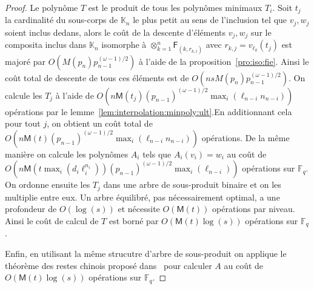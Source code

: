 \documentclass[10pt,a4paper]{book}
\theoremstyle{plain}
\theoremstyle{definition}
\theoremstyle{definition}
\theoremstyle{definition}
\theoremstyle{definition}
\theoremstyle{remark}
\theoremstyle{remark}
\theoremstyle{definition}
\begin{document}
\begin{proof}
  Le polynôme $T$ est le produit de tous les polynômes minimaux $T_i$. 
  Soit $t_j$ la cardinalité du sous-corps de $\mathbb{K}_n$ le plus petit au 
  sens  de l'inclusion tel que $v_j,w_j$ soient inclus dedans, alors le coût de
  la descente d'éléments $v_j,w_j$ sur le composita inclus dans $\mathbb{K}_n$ 
  isomorphe à $\otimes_{k=1}^n\mathsf{F}_{(k,r_{k,i})}$ avec 
  $r_{k,j}=v_{\ell_k}(t_j)$ est majoré par $O(M(p_n)p_{n-1}^{(\omega-1)/2})$ à 
  l'aide de la proposition~\ref{pro:iso:fie}. Ainsi le coût total de descente 
  de tous ces éléments est de $O(nsM(p_n)p_{n-1}^{(\omega-1)/2})$.
  On calcule les $T_j$ à l'aide de
   $O(n\mathsf{M}(t_j)(p_{n-1})^{(\omega-1)/2} \max_{i}(\ell_{n-i}n_{n-i}))$ 
  opérations par le lemme~\ref{lem:interpolation:minpoly:ult}.En additionnant 
  cela pour tout $j$, %
  on obtient un coût total de $O(n\mathsf{M}(t)(p_{n-1})^{(\omega-1)/2} \max_{i}(\ell_{n-i}n_{n-i}))$ opérations.
  De la même manière on calcule les polynômes $A_i$ tels que $A_i(v_i)=w_i$
  au coût de $O(n\mathsf{M}(t \max_i(d_i\ell_i^{n_i}))(p_{n-1})^{(\omega-1)/2} \max_{i}(\ell_{n-i}))$
  opérations sur $\mathbb{F}_q$.
  On ordonne ensuite les $T_j$ dans une arbre de sous-produit binaire et 
  on les multiplie entre eux. Un arbre équilibré, pas nécessairement optimal,
  a une profondeur de $O(\log (s))$ et nécessite $O(\mathsf{M}(t))$ opérations
   par niveau. Ainsi le coût de calcul de $T$ est borné par 
   $O(\mathsf{M}(t)\log(s))$ opérations sur $\mathbb{F}_q$.
  
  Enfin, en utilisant la même strucutre d'arbre de sous-produit on applique le 
  théorème des restes chinois proposé dans~\cite[Chapter~10]{vzGJG03} pour 
  calculer $A$ au coût de $O(\mathsf{M}(t)\log(s))$ opérations sur $\mathbb{F}_q$.
\end{proof}

\printnomenclature


\end{document}
